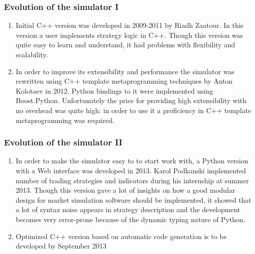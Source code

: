 \documentclass{beamer}
\begin{document}
\begin{frame}
\frametitle{Evolution of the simulator I}
\begin{enumerate}
  \item Initial C++ version was developed in 2009-2011 by Riadh Zaatour. In this version a user implements strategy logic in C++. Though this version was quite easy to learn and understand, it had problems with flexibility and scalability.
  \item In order to improve its extensibility and performance the simulator was rewritten using C++ template metaprogramming techniques by Anton Kolotaev in 2012. Python bindings to it were implemented using Boost.Python. Unfortunately the price for providing high extensibility with no overhead was quite high: in order to use it a proficiency in C++ template metaprogramming was required.
\end{enumerate}
\end{frame}
\begin{frame}
\frametitle{Evolution of the simulator II}
\begin{enumerate}
  \item In order to make the simulator easy to to start work with, a Python version with a Web interface was developed in 2013. Karol Podkanski implemented number of trading strategies and indicators during his internship at summer 2013. Though this version gave a lot of insights on how a good modular design for market simulation software should be implemented, it showed that a lot of syntax noise appears in strategy description and the development becomes very error-prone because of the dynamic typing nature of Python.
  \item Optimized C++ version based on automatic code generation is to be developed by September 2013
\end{enumerate}
\end{frame}
\end{document}
